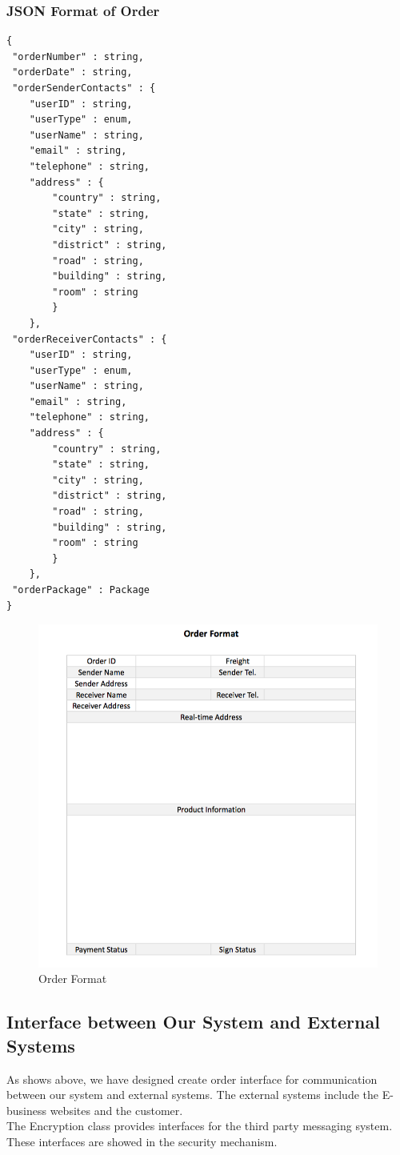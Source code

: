 \documentclass[12pt]{scrreprt}
\begin{document}
\subsubsection{JSON Format of Order}
\begin{lstlisting}
{
 "orderNumber" : string,
 "orderDate" : string,
 "orderSenderContacts" : {
 	"userID" : string,
 	"userType" : enum,
 	"userName" : string,
 	"email" : string,
 	"telephone" : string,
 	"address" : {
 		"country" : string,
 		"state" : string,
 		"city" : string,
 		"district" : string,
 		"road" : string,
 		"building" : string,
 		"room" : string
 		}
 	},
 "orderReceiverContacts" : {
 	"userID" : string,
 	"userType" : enum,
 	"userName" : string,
 	"email" : string,
 	"telephone" : string,
 	"address" : {
 		"country" : string,
 		"state" : string,
 		"city" : string,
 		"district" : string,
 		"road" : string,
 		"building" : string,
 		"room" : string
 		}
 	},
 "orderPackage" : Package
}
\end{lstlisting}
\begin{figure}[htbp]
	\centering\includegraphics[width=7in]{DocumentRes/OrderFormat.png}
	\caption{Order Format}
\end{figure}

\subsection{Interface between Our System and External Systems}
As shows above, we have designed create order interface for communication between our system and external systems. The external systems include the E-business websites and the customer.\\
The Encryption class provides interfaces for the third party messaging system. These interfaces are showed in the security mechanism.\\
\end{document}
